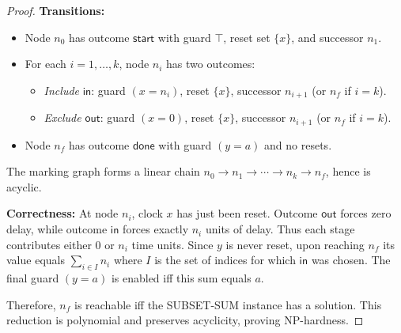 \begin{proof}
\textbf{Transitions:}
\begin{itemize}
\item Node $n_0$ has outcome $\mathsf{start}$ with guard $\top$, reset set $\{x\}$, and successor $n_1$.
\item For each $i = 1, \ldots, k$, node $n_i$ has two outcomes:
  \begin{itemize}
  \item \emph{Include} $\mathsf{in}$: guard $(x = n_i)$, reset $\{x\}$, successor $n_{i+1}$ (or $n_f$ if $i = k$).
  \item \emph{Exclude} $\mathsf{out}$: guard $(x = 0)$, reset $\{x\}$, successor $n_{i+1}$ (or $n_f$ if $i = k$).
  \end{itemize}
\item Node $n_f$ has outcome $\mathsf{done}$ with guard $(y = a)$ and no resets.
\end{itemize}

The marking graph forms a linear chain $n_0 \to n_1 \to \cdots \to n_k \to n_f$, hence is acyclic.

\textbf{Correctness:}
At node $n_i$, clock $x$ has just been reset. Outcome $\mathsf{out}$ forces zero delay, while outcome $\mathsf{in}$ forces exactly $n_i$ units of delay. Thus each stage contributes either 0 or $n_i$ time units. Since $y$ is never reset, upon reaching $n_f$ its value equals $\sum_{i \in I} n_i$ where $I$ is the set of indices for which $\mathsf{in}$ was chosen. The final guard $(y = a)$ is enabled iff this sum equals $a$.

Therefore, $n_f$ is reachable iff the SUBSET-SUM instance has a solution. This reduction is polynomial and preserves acyclicity, proving NP-hardness.
\end{proof}

